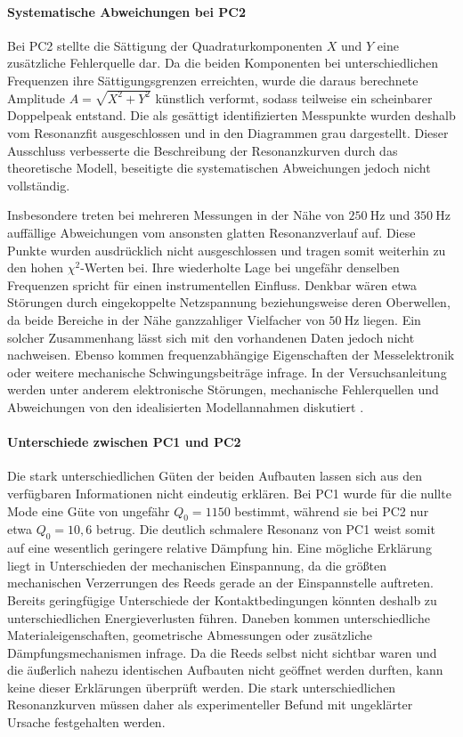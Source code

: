 \documentclass[11pt,a4paper]{article}
\begin{document}
\paragraph{Systematische Abweichungen bei PC2}
Bei PC2 stellte die Sättigung der Quadraturkomponenten $X$ und $Y$ eine zusätzliche Fehlerquelle dar. Da die beiden Komponenten bei unterschiedlichen Frequenzen ihre Sättigungsgrenzen erreichten, wurde die daraus berechnete Amplitude $A=\sqrt{X^2+Y^2}$ künstlich verformt, sodass teilweise ein scheinbarer Doppelpeak entstand. Die als gesättigt identifizierten Messpunkte wurden deshalb vom Resonanzfit ausgeschlossen und in den Diagrammen grau dargestellt. Dieser Ausschluss verbesserte die Beschreibung der Resonanzkurven durch das theoretische Modell, beseitigte die systematischen Abweichungen jedoch nicht vollständig.

Insbesondere treten bei mehreren Messungen in der Nähe von $\qty{250}{\hertz}$ und $\qty{350}{\hertz}$ auffällige Abweichungen vom ansonsten glatten Resonanzverlauf auf. Diese Punkte wurden ausdrücklich nicht ausgeschlossen und tragen somit weiterhin zu den hohen $\chi^2$-Werten bei. Ihre wiederholte Lage bei ungefähr denselben Frequenzen spricht für einen instrumentellen Einfluss. Denkbar wären etwa Störungen durch eingekoppelte Netzspannung beziehungsweise deren Oberwellen, da beide Bereiche in der Nähe ganzzahliger Vielfacher von $\qty{50}{\hertz}$ liegen. Ein solcher Zusammenhang lässt sich mit den vorhandenen Daten jedoch nicht nachweisen. Ebenso kommen frequenzabhängige Eigenschaften der Messelektronik oder weitere mechanische Schwingungsbeiträge infrage. In der Versuchsanleitung werden unter anderem elektronische Störungen, mechanische Fehlerquellen und Abweichungen von den idealisierten Modellannahmen diskutiert \autocite[24--25]{Skript}.

\paragraph{Unterschiede zwischen PC1 und PC2}
Die stark unterschiedlichen Güten der beiden Aufbauten lassen sich aus den verfügbaren Informationen nicht eindeutig erklären. Bei PC1 wurde für die nullte Mode eine Güte von ungefähr $Q_0=1150$ bestimmt, während sie bei PC2 nur etwa $Q_0=10{,}6$ betrug. Die deutlich schmalere Resonanz von PC1 weist somit auf eine wesentlich geringere relative Dämpfung hin. Eine mögliche Erklärung liegt in Unterschieden der mechanischen Einspannung, da die größten mechanischen Verzerrungen des Reeds gerade an der Einspannstelle auftreten. Bereits geringfügige Unterschiede der Kontaktbedingungen könnten deshalb zu unterschiedlichen Energieverlusten führen. Daneben kommen unterschiedliche Materialeigenschaften, geometrische Abmessungen oder zusätzliche Dämpfungsmechanismen infrage. Da die Reeds selbst nicht sichtbar waren und die äußerlich nahezu identischen Aufbauten nicht geöffnet werden durften, kann keine dieser Erklärungen überprüft werden. Die stark unterschiedlichen Resonanzkurven müssen daher als experimenteller Befund mit ungeklärter Ursache festgehalten werden.
\end{document}
